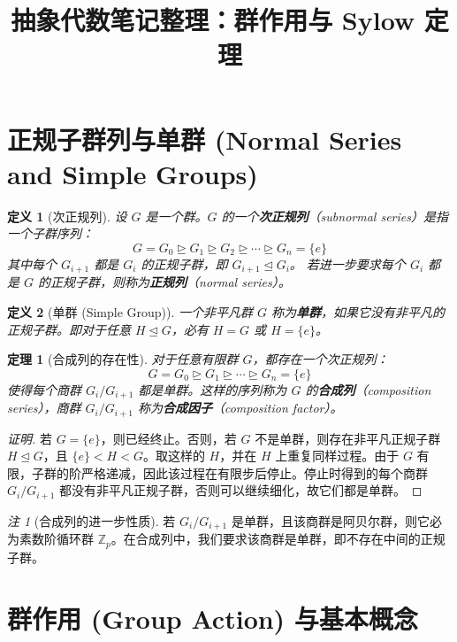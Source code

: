 \documentclass[11pt,a4paper]{ctexart}
\title{抽象代数笔记整理：群作用与 Sylow 定理}
\author{}
\date{}
\makeatletter
\newtheorem*{theorem}{定理}
\newtheorem*{definition}{定义}
\theoremstyle{remark}
\newtheorem*{remark}{注}
\renewcommand{\maketitle}{%
    \par
    \begingroup
    \raggedright
    \vspace{1em}
    {\LARGE\bfseries \@title \par}%
    \vspace{0.5em}
    {\large \@author \par}%
    \vspace{0.5em}
    {\large \@date \par}%
    \vspace{1em}
    \endgroup
    \par
}
\makeatother
\begin{document}
\maketitle

\section*{正规子群列与单群 (Normal Series and Simple Groups)}

\begin{definition}[次正规列]
设 \(G\) 是一个群。\(G\) 的一个\textbf{次正规列}（subnormal series）是指一个子群序列：
\[
G = G_0 \trianglerighteq G_1 \trianglerighteq G_2 \trianglerighteq \cdots \trianglerighteq G_n = \{e\}
\]
其中每个 \(G_{i+1}\) 都是 \(G_i\) 的正规子群，即 \(G_{i+1} \trianglelefteq G_i\)。
若进一步要求每个 \(G_i\) 都是 \(G\) 的正规子群，则称为\textbf{正规列}（normal series）。
\end{definition}

\begin{definition}[单群 (Simple Group)]
一个非平凡群 \(G\) 称为\textbf{单群}，如果它没有非平凡的正规子群。即对于任意 \(H \trianglelefteq G\)，必有 \(H = G\) 或 \(H = \{e\}\)。
\end{definition}

\begin{theorem}[合成列的存在性]
对于任意有限群 \(G\)，都存在一个次正规列：
\[
G = G_0 \trianglerighteq G_1 \trianglerighteq \cdots \trianglerighteq G_n = \{e\}
\]
使得每个商群 \(G_i / G_{i+1}\) 都是单群。这样的序列称为 \(G\) 的\textbf{合成列}（composition series），商群 \(G_i / G_{i+1}\) 称为\textbf{合成因子}（composition factor）。
\end{theorem}

\begin{proof}[证明]
若 \(G=\{e\}\)，则已经终止。否则，若 \(G\) 不是单群，则存在非平凡正规子群 \(H\trianglelefteq G\)，且 \(\{e\}<H<G\)。取这样的 \(H\)，并在 \(H\) 上重复同样过程。由于 \(G\) 有限，子群的阶严格递减，因此该过程在有限步后停止。停止时得到的每个商群 \(G_i/G_{i+1}\) 都没有非平凡正规子群，否则可以继续细化，故它们都是单群。
\end{proof}

\begin{remark}[合成列的进一步性质]
若 \(G_i / G_{i+1}\) 是单群，且该商群是阿贝尔群，则它必为素数阶循环群 \(\mathbb{Z}_p\)。在合成列中，我们要求该商群是单群，即不存在中间的正规子群。
\end{remark}

\section*{群作用 (Group Action) 与基本概念}
\end{document}
